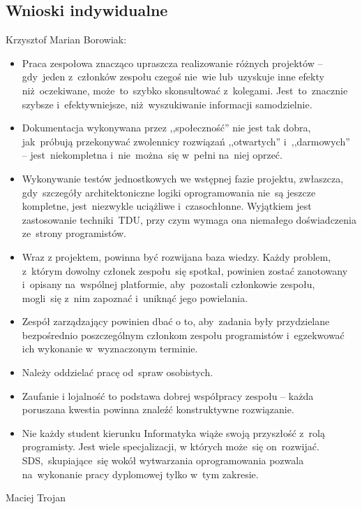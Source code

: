 \subsection{Wnioski indywidualne}
\label{Chapter821}

\begin{description}
\item Krzysztof Marian Borowiak:
\begin{itemize}
\item Praca zespołowa znacząco upraszcza realizowanie różnych projektów -- gdy~jeden z~członków zespołu czegoś nie~wie lub~uzyskuje inne efekty niż~oczekiwane, może~to~szybko skonsultować z~kolegami. Jest~to~znacznie szybsze i~efektywniejsze, niż~wyszukiwanie informacji samodzielnie.
\item Dokumentacja wykonywana przez ,,społeczność'' nie jest tak dobra, jak~próbują przekonywać zwolennicy rozwiązań ,,otwartych'' i~,,darmowych'' -- jest~niekompletna i~nie~można~się w~pełni na~niej oprzeć.
\item Wykonywanie testów jednostkowych we wstępnej fazie projektu, zwłaszcza, gdy~szczegóły architektoniczne logiki oprogramowania nie~są jeszcze kompletne, jest~niezwykle uciążliwe i~czasochłonne. Wyjątkiem jest zastosowanie techniki~TDU, przy czym wymaga ona niemałego doświadczenia ze~strony programistów.
\item Wraz z projektem, powinna być rozwijana baza wiedzy. Każdy problem, z~którym dowolny członek zespołu~się spotkał, powinien zostać zanotowany i~opisany na~wspólnej platformie, aby~pozostali członkowie zespołu, mogli~się z~nim zapoznać i~uniknąć jego powielania.
\item Zespół zarządzający powinien dbać o to, aby~zadania były przydzielane bezpośrednio poszczególnym członkom zespołu programistów i~egzekwować ich wykonanie w~wyznaczonym terminie.
\item Należy oddzielać pracę od~spraw osobistych.
\item Zaufanie i lojalność to podstawa dobrej współpracy zespołu -- każda poruszana kwestia powinna znaleźć konstruktywne rozwiązanie.
\item Nie każdy student kierunku Informatyka wiąże swoją przyszłość z~rolą programisty. Jest wiele specjalizacji, w których może~się on~rozwijać. SDS,~skupiające~się wokół wytwarzania oprogramowania pozwala na~wykonanie pracy dyplomowej tylko w~tym zakresie.
\end{itemize}
\item Maciej Trojan
\begin{itemize}

\end{itemize}
\end{description}
